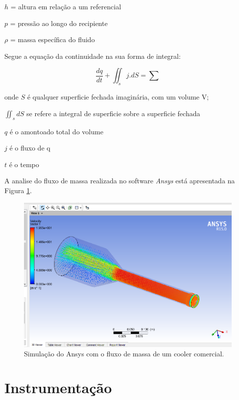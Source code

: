 		$h$ = altura em relação a um referencial
		
		$p$ = pressão ao longo do recipiente
		
		$\rho$ = massa específica do fluido

		Segue a equação da continuidade na sua forma de integral:

		\begin{equation}
		\frac{dq}{dt} + \iint_{s}^{ }j . dS= \sum
		\end{equation}
		
		onde $S$ é qualquer superficie fechada imaginária, com um volume V;

		$\iint_{s}^{ }dS$ se refere a integral de superficie sobre a superficie fechada

		$q$ é o amontoado total do volume

		$j$ é o fluxo de q

		$t$ é o tempo


		A analise do fluxo de massa realizada no software \textit{Ansys} está apresentada na Figura \ref{img:analise_fluxo}.

		\begin{figure}[H]
			\centering
			\includegraphics[scale=0.4]{figuras/analise_fluxo.png}
			\caption{Simulação do Ansys com o fluxo de massa de um cooler comercial.}
			\label{img:analise_fluxo}
		\end{figure}




\section{Instrumentação} %
\label{sub:instrumentação}
	
